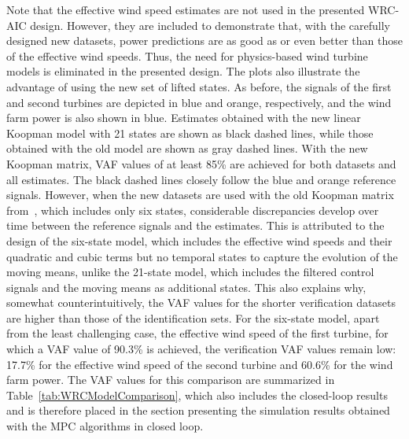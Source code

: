 Note that the effective wind speed estimates are not used in the presented WRC-AIC design. However, they are included to demonstrate that, with the carefully designed new datasets, power predictions are as good as or even better than those of the effective wind speeds. Thus, the need for physics-based wind turbine models is eliminated in the presented design. The plots also illustrate the advantage of using the new set of lifted states. As before, the signals of the first and second turbines are depicted in blue and orange, respectively, and the wind farm power is also shown in blue. Estimates obtained with the new linear Koopman model with 21 states are shown as black dashed lines, while those obtained with the old model are shown as gray dashed lines. With the new Koopman matrix, VAF values of at least 85\% are achieved for both datasets and all estimates. The black dashed lines closely follow the blue and orange reference signals. However, when the new datasets are used with the old Koopman matrix from~\cite{dittmer2023koopman}, which includes only six states, considerable discrepancies develop over time between the reference signals and the estimates. This is attributed to the design of the six-state model, which includes the effective wind speeds and their quadratic and cubic terms but no temporal states to capture the evolution of the moving means, unlike the 21-state model, which includes the filtered control signals and the moving means as additional states. This also explains why, somewhat counterintuitively, the VAF values for the shorter verification datasets are higher than those of the identification sets. For the six-state model, apart from the least challenging case, the effective wind speed of the first turbine, for which a VAF value of 90.3\% is achieved, the verification VAF values remain low: 17.7\% for the effective wind speed of the second turbine and 60.6\% for the wind farm power. The VAF values for this comparison are summarized in Table~\ref{tab:WRCModelComparison}, which also includes the closed-loop results and is therefore placed in the section presenting the simulation results obtained with the MPC algorithms in closed loop.

